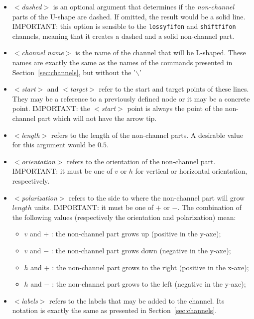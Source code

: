 \documentclass[11pt]{article}
\begin{document}
\begin{itemize}
\item \emph{$<$dashed$>$} is an optional argument that determines if the \emph{non-channel} parts of the U-shape are dashed. If omitted, the result would be a solid line. IMPORTANT: this option is sensible to the \texttt{lossyfifon} and \texttt{shiftfifon} channels, meaning that it creates a dashed and a solid non-channel part.

\item \emph{$<$channel name$>$} is the name of the channel that will be L-shaped. These names are exactly the same as the names of the commands presented in Section~\ref{sec:channels}, but without the '$\backslash $'

\item \emph{$<$start$>$} and \emph{$<$target$>$} refer to the start and target points of these lines. They may be a reference to a previously defined node or it may be a concrete point. IMPORTANT: the \emph{$<$start$>$} point is always the point of the non-channel part which will not have the arrow tip.

\item \emph{$<$length$>$} refers to the length of the non-channel parts. A desirable value for this argument would be $0.5$.

\item \emph{$<$orientation$>$} refers to the orientation of the non-channel part. IMPORTANT: it must be one of $v$ or $h$ for vertical or horizontal orientation, respectively. 

\item \emph{$<$polarization$>$} refers to the side to where the non-channel part will grow $length$ units. IMPORTANT: it must be one of $+$ or $-$. 
The combination of the following values (respectively the orientation and polarization) mean:
\begin{itemize}
\item  $v$ and $+$ : the non-channel part grows up (positive in the y-axe);
\item  $v$ and $-$ : the non-channel part grows down (negative in the y-axe);
\item  $h$ and $+$ : the non-channel part grows to the right (positive in the x-axe);
\item  $h$ and $-$ : the non-channel part grows to the left (negative in the y-axe);
\end{itemize}

\item \emph{$<$labels$>$} refers to the labels that may be added to the channel. Its notation is exactly the same as presented in Section~\ref{sec:channels}.



\end{itemize}
\end{document}
